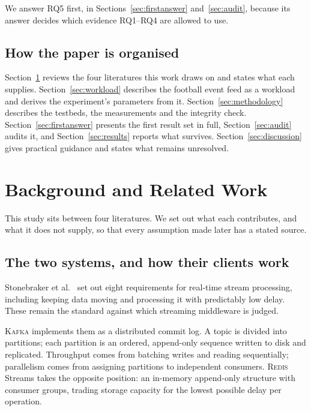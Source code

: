 \documentclass[Afour,sageh,times]{sagej}
\newcommand{\redis}{\textsc{Redis}}
\newcommand{\kafka}{\textsc{Kafka}}
\begin{document}
We answer RQ5 first, in Sections~\ref{sec:firstanswer} and~\ref{sec:audit}, because its answer
decides which evidence RQ1--RQ4 are allowed to use.

\subsection{How the paper is organised}

Section~\ref{sec:literature} reviews the four literatures this work draws on and states what each
supplies. Section~\ref{sec:workload} describes the football event feed as a workload and derives
the experiment's parameters from it. Section~\ref{sec:methodology} describes the testbeds, the
measurements and the integrity check. Section~\ref{sec:firstanswer} presents the first result set
in full, Section~\ref{sec:audit} audits it, and Section~\ref{sec:results} reports what survives.
Section~\ref{sec:discussion} gives practical guidance and states what remains unresolved.


\section{Background and Related Work}
\label{sec:literature}

This study sits between four literatures. We set out what each contributes, and what it does not
supply, so that every assumption made later has a stated source.

\subsection{The two systems, and how their clients work}
\label{sec:lit_systems}

Stonebraker et al.\ \cite{stonebraker2005stream} set out eight requirements for real-time stream
processing, including keeping data moving and processing it with predictably low delay. These
remain the standard against which streaming middleware is judged.

\kafka{} \cite{kreps2011kafka} implements them as a distributed commit log. A topic is divided
into partitions; each partition is an ordered, append-only sequence written to disk and
replicated. Throughput comes from batching writes and reading sequentially; parallelism comes
from assigning partitions to independent consumers. \redis{} Streams \cite{redis2017streams}
takes the opposite position: an in-memory append-only structure with consumer groups, trading
storage capacity for the lowest possible delay per operation.
\end{document}
